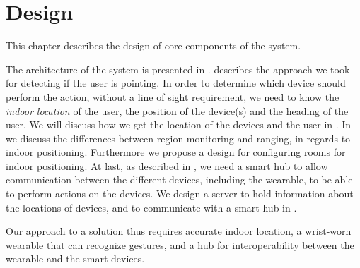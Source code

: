 \chapter{Design}\label{chap:design}

This chapter describes the design of core components of the system.

The architecture of the system is presented in .
 describes the approach we took for detecting if the user is pointing.
In order to determine which device should perform the action, 
without a line of sight requirement, 
we need to know the \emph{indoor location} of the user, 
the position of the device(s) and the heading of the user. 
We will discuss how we get the location of the devices and the user in .
In  we discuss the differences between region monitoring and ranging, 
in regards to indoor positioning. 
Furthermore we propose a design for configuring rooms for indoor positioning.
At last, as described in , 
we need a smart hub to allow communication between the different devices, 
including the wearable, to be able to perform actions on the devices. 
We design a server to hold information about the locations of devices,
and to communicate with a smart hub in . 

Our approach to a solution thus requires accurate indoor location, 
a wrist-worn wearable that can recognize gestures, 
and a hub for interoperability between the wearable and the smart devices. 








